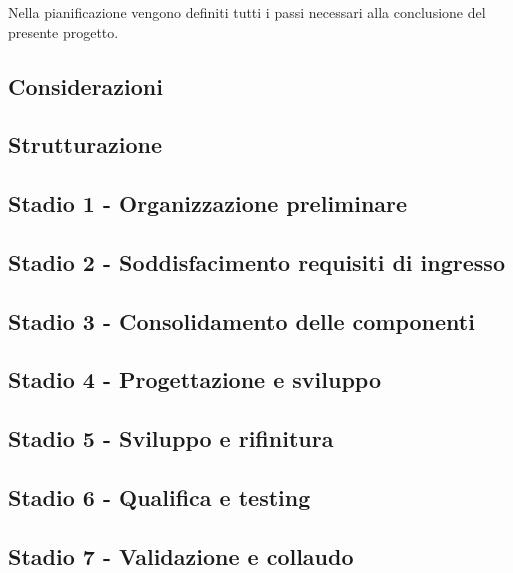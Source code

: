 Nella pianificazione vengono definiti tutti i passi necessari alla conclusione del presente progetto.

\subsection{Considerazioni}\label{sec:Considerazioni}


\subsection{Strutturazione}\label{sec:Strutturazione}


\subsection{Stadio 1 - Organizzazione preliminare}\label{sec:Stadio1}


\subsection{Stadio 2 - Soddisfacimento requisiti di ingresso}\label{sec:Stadio2}

    
\subsection{Stadio 3 - Consolidamento delle componenti}\label{sec:Stadio3}

    
\subsection{Stadio 4 - Progettazione e sviluppo}\label{sec:Stadio4}

    
\subsection{Stadio 5 - Sviluppo e rifinitura }\label{sec:Stadio5}

    
\subsection{Stadio 6 - Qualifica e testing}\label{sec:Stadio6}

    
\subsection{Stadio 7 - Validazione e collaudo}\label{sec:Stadio7}
